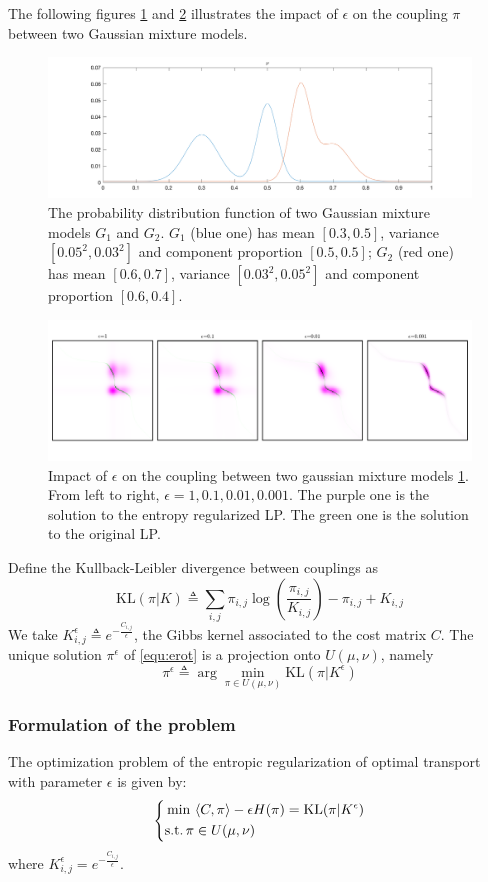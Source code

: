 The following figures \ref{gmm1} and \ref{gmm2} illustrates the impact of $\epsilon$ on the coupling $\pi$ between two Gaussian mixture models.
\begin{figure}[!htb]
\centering
\includegraphics[width=12cm]{final/gmm1.png}
\caption{The probability distribution function of two Gaussian mixture models $G_1$ and $G_2$. $G_1$ (blue one) has mean $[0.3,0.5]$, variance $[0.05^2, 0.03^2]$ and component proportion $[0.5, 0.5]$; $G_2$ (red one) has mean $[0.6,0.7]$, variance $[0.03^2, 0.05^2]$ and component proportion $[0.6, 0.4]$. }
\label{gmm1}
\end{figure}

\begin{figure}[!htb]
\centering
\includegraphics[width=12cm]{final/gmm2.png}
\caption{Impact of $\epsilon$ on the coupling between two gaussian mixture models \ref{gmm1}. From left to right, $\epsilon=1,0.1,0.01,0.001$. The purple one is the solution to the entropy regularized LP. The green one is the solution to the original LP.}
\label{gmm2}
\end{figure}

Define the Kullback-Leibler divergence between couplings as
$$
\mathrm{KL}(\pi|K)\triangleq\sum_{i,j}\pi_{i,j}\log(\frac{\pi_{i,j}}{K_{i,j}})-\pi_{i,j}+K_{i,j}
$$
We take $K^\epsilon_{i,j}\triangleq e^{-\frac{C_{i,j}}{\epsilon}}$, the Gibbs kernel associated to the cost matrix $C$. The unique solution $\pi^\epsilon$ of \ref{equ:erot} is a projection onto $U(\mu,\nu)$, namely
$$
\pi^\epsilon\triangleq\arg\min\limits_{\pi\in U(\mu,\nu)}\mathrm{KL}(\pi|K^\epsilon)
$$

\subsubsection{Formulation of the problem}
The optimization problem of the entropic regularization of optimal transport with parameter $\epsilon$ is given by:
\begin{equation}
\label{equ:kl}
\left\{
\begin{aligned}
&\min \, \left\langle C,\pi\right\rangle-\epsilon H(\pi)=\mathrm{KL}(\pi|K^\epsilon)\\
&\mathrm{s.t.}\, \pi\in U(\mu, \nu)
\end{aligned}\right.
\end{equation}
where $K^\epsilon_{i,j}= e^{-\frac{C_{i,j}}{\epsilon}}$.

